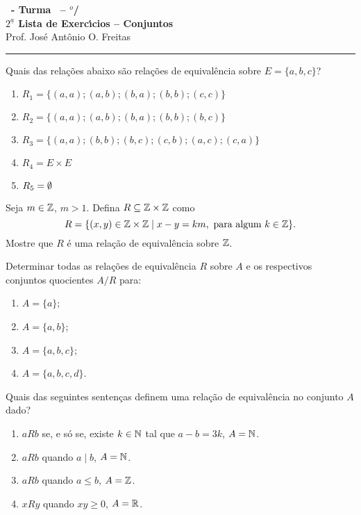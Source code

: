 \documentclass[12pt]{exam}
\begin{document}
\begin{center}
{\Large\bf \disciplina\ - Turma \turma\ -- \semestre$^{o}$/\ano} \\ \vspace{9pt} {\large\bf
  $2^{\underline{a}}$ Lista de Exerc{\'\i}cios -- Conjuntos}\\ \vspace{9pt} Prof. Jos{\'e} Ant{\^o}nio O. Freitas
\end{center}
\hrule

\vspace{.6cm}

\questao Quais das rela{\c c}{\~o}es abaixo s{\~a}o rela{\c c}{\~o}es de equival{\^e}ncia sobre $E = \{a,b,c\}$?
\begin{enumerate}[label={\alph*})]
\item $R_1 = \{(a,a);(a,b);(b,a);(b,b);(c,c)\}$
\item $R_2 = \{(a,a);(a,b);(b,a);(b,b);(b,c)\}$
\item $R_3 = \{(a,a);(b,b);(b,c);(c,b);(a,c);(c,a)\}$
\item $R_4 = E \times E$
\item $R_5 = \emptyset$
\end{enumerate}

\vspace{.3cm}

\questao Seja $m \in \mathbb{Z}$, $m > 1$. Defina $R \subseteq \mathbb{Z}\times\mathbb{Z}$ como
\[
  R = \{(x,y) \in \mathbb{Z}\times\mathbb{Z} \mid x - y = km, \mbox{ para algum } k \in \mathbb{Z}\}.
\]
Mostre que $R$ \'e uma rela\c{c}\~ao de equival\^encia sobre $\mathbb{Z}$.

\vspace{.3cm}

\questao Determinar todas as rela{\c c}{\~o}es de equival{\^e}ncia
$R$ sobre $A$ e os respectivos conjuntos quocientes $A/R$ para:
\begin{enumerate}[label={\alph*})]
\item $A=\{a\}$;
\item $A=\{a,b\}$;
\item $A=\{a,b,c\}$;
\item $A=\{a,b,c,d\}$.
\end{enumerate}

\vspace{.3cm}

\questao Quais das seguintes senten{\c c}as definem uma rela{\c c}{\~a}o de equival{\^e}ncia no conjunto $A$ dado?
\begin{enumerate}[label={\alph*})]
\item $aRb$ se, e s{\'o} se, existe $k \in \mathbb{N}$ tal que $a - b = 3k$, $A = \mathbb{N}$.
\item $aRb$ quando $a \mid b$, $A = \mathbb{N}$.
\item $aRb$ quando $a \le b$, $A = \mathbb{Z}$.
\item $xRy$ quando $xy \ge 0$, $ A = \mathbb{R}$.
\end{enumerate}
\end{document}
